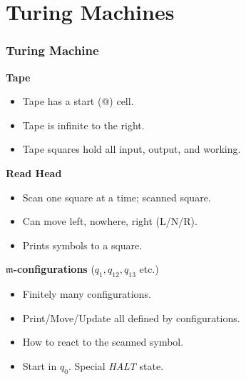 \documentclass{beamer}
\begin{document}
\section{Turing Machines}

\begin{frame}
	\frametitle{Turing Machine}

		{\bf Tape}

		\begin{itemize}
			\item[] Tape has a start (@) cell. 
			\item[] Tape is infinite to the right. 
			\item[] Tape squares hold all input, output, and working.
		\end{itemize}

		{\bf Read Head}

		\begin{itemize}
			\item[] Scan one square at a time; scanned square.
			\item[] Can move left, nowhere, right (L/N/R).
			\item[] Prints symbols to a square.
		\end{itemize}

		{\bf $\mathfrak{m}$-configurations} ($q_{1}, q_{12}, q_{13}$ etc.)

		\begin{itemize}
			\item[] Finitely many configurations.
			\item[] Print/Move/Update all defined by configurations.
			\item[] How to react to the scanned symbol.
			\item[] Start in $q_{0}$. Special \emph{HALT} state.
		\end{itemize}
\end{frame}
\end{document}
